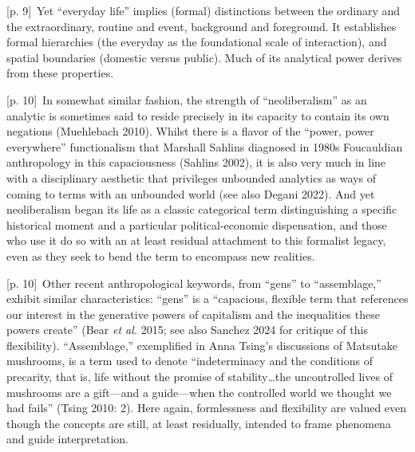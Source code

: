 \documentclass[10pt,a4paper]{article}
\begin{document}
{\scriptsize\color{gray} [p. 9]}\ Yet “everyday life” implies (formal) distinctions between the ordinary and the extraordinary, routine and event, background and foreground. It establishes formal hierarchies (the everyday as the foundational scale of interaction), and spatial boundaries (domestic versus public). Much of its analytical power derives from these properties.\par
{\scriptsize\color{gray} [p. 10]}\ In somewhat similar fashion, the strength of “neoliberalism” as an analytic is sometimes said to reside precisely in its capacity to contain its own negations (Muehlebach 2010). Whilst there is a flavor of the “power, power everywhere” functionalism that Marshall Sahlins diagnosed in 1980s Foucauldian anthropology in this capaciousness (Sahlins 2002), it is also very much in line with a disciplinary aesthetic that privileges unbounded analytics as ways of coming to terms with an unbounded world (see also Degani 2022). And yet neoliberalism began its life as a classic categorical term distinguishing a specific historical moment and a particular political-economic dispensation, and those who use it do so with an at least residual attachment to this formalist legacy, even as they seek to bend the term to encompass new realities.\par
{\scriptsize\color{gray} [p. 10]}\ Other recent anthropological keywords, from “gens” to “assemblage,” exhibit similar characteristics: “gens” is a “capacious, flexible term that references our interest in the generative powers of capitalism and the inequalities these powers create” (Bear \textit{et al.} 2015; see also Sanchez 2024 for critique of this flexibility). “Assemblage,” exemplified in Anna Tsing’s discussions of Matsutake mushrooms, is a term used to denote “indeterminacy and the conditions of precarity, that is, life without the promise of stability…the uncontrolled lives of mushrooms are a gift—and a guide—when the controlled world we thought we had fails” (Tsing 2010: 2). Here again, formlessness and flexibility are valued even though the concepts are still, at least residually, intended to frame phenomena and guide interpretation.\par
\end{document}
